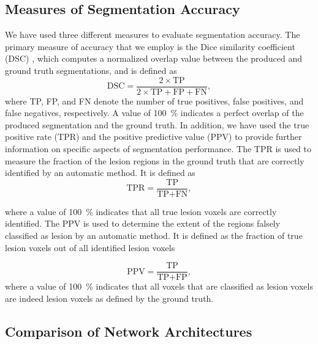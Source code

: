 \subsection{Measures of Segmentation Accuracy}

We have used three different measures to evaluate segmentation accuracy. The
primary measure of accuracy that we employ is the Dice similarity coefficient
(DSC) \cite{dice1945measures}, which computes a normalized overlap value between
the produced and ground truth segmentations, and is defined as
\begin{equation}
\text{DSC} = \frac{2 \times \text{TP}}{2 \times \text{TP} + \text{FP} +
\text{FN}},
\end{equation}
where TP, FP, and FN denote the number of true positives, false positives, and
false negatives, respectively. A value of \SI{100}{\percent} indicates a perfect
overlap of the produced segmentation and the ground truth.
In addition, we have used the true positive rate (TPR) and the positive
predictive value (PPV) to provide further information on specific aspects of
segmentation performance. The TPR is used to measure the fraction of the lesion
regions in the ground truth that are correctly identified by
an automatic method. It is defined as
\begin{equation}
\text{TPR} = \frac{\text{TP}}{\text{TP} + \text{FN}},
\end{equation}

where a value of \SI{100}{\percent} indicates that all true lesion voxels are
correctly identified. The PPV is used to determine the extent of the regions
falsely classified as lesion by an automatic method. It is defined as the
fraction of true lesion voxels out of all identified lesion voxels

\begin{equation}
\text{PPV} = \frac{\text{TP}}{\text{TP} + \text{FP}},
\end{equation}
where a value of \SI{100}{\percent} indicates that all voxels that are
classified as lesion voxels are indeed lesion voxels as defined by the ground
truth.

\subsection{Comparison of Network Architectures}

